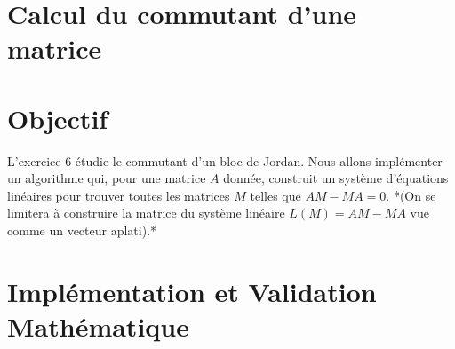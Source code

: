 \documentclass[11pt,a4paper]{article}
\begin{document}
\section{Calcul du commutant d'une matrice}

\section{Objectif}
L'exercice 6 étudie le commutant d'un bloc de Jordan. Nous allons implémenter un algorithme qui, pour une matrice $A$ donnée, construit un système d'équations linéaires pour trouver toutes les matrices $M$ telles que $A M - M A = 0$.
*(On se limitera à construire la matrice du système linéaire $L(M) = AM - MA$ vue comme un vecteur aplati).*

\section{Implémentation et Validation Mathématique}
\end{document}
